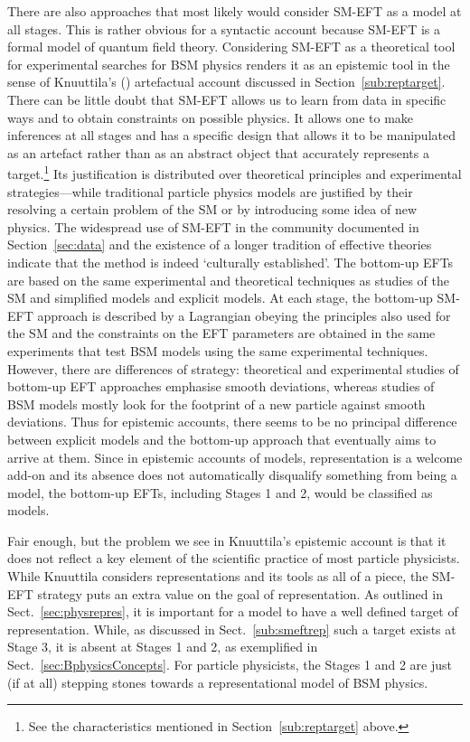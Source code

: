 There are also approaches that most likely would consider SM-EFT as a model at all stages. 
This is rather obvious for a syntactic account because SM-EFT is a formal model of quantum field theory. 
Considering SM-EFT as a theoretical tool for experimental searches for BSM physics renders it as an epistemic tool in the sense of Knuuttila's (\citeyear{knuuttila2011,Knuuttila2017}) artefactual account discussed in Section~\ref{sub:reptarget}.  
There can be little doubt that SM-EFT allows us to learn from data in specific ways and to obtain constraints on possible physics.
It allows one to make inferences at all stages and has a specific design that allows it to be manipulated as an artefact rather than as an abstract object that accurately represents a target.\footnote{See the characteristics mentioned in Section~\ref{sub:reptarget} above.} 
Its justification is distributed over theoretical principles and experimental strategies---while traditional particle physics models are justified by their resolving a certain problem of the SM or by introducing some idea of new physics.
The widespread use of SM-EFT in the community documented in Section~\ref{sec:data} and the existence of a longer tradition of effective theories \citep{wells2011} indicate that the method is indeed `culturally established'. 
The bottom-up EFTs are based on the same experimental and theoretical techniques as studies of the SM and simplified models and explicit models. 
At each stage, the bottom-up SM-EFT approach is described by a Lagrangian 
obeying the principles also used for the SM and the constraints on the EFT parameters are obtained in the same experiments that test BSM models using the same experimental techniques. 
However, there are differences of strategy: theoretical and experimental studies of bottom-up EFT approaches emphasise smooth deviations, whereas studies of BSM models mostly look for the footprint of a new particle against smooth deviations.
Thus for epistemic accounts, there seems to be no principal difference between explicit models and the bottom-up approach that eventually aims to arrive at them. 
Since in epistemic accounts of models, representation is a welcome add-on and its absence does not automatically disqualify something from being a model, the bottom-up EFTs, including Stages 1 and 2, would be classified as models.


Fair enough, but the problem we see in Knuuttila's epistemic account is that it does not reflect a key element of the scientific practice of most particle physicists. 
While Knuuttila considers representations and its tools as all of a piece, the SM-EFT strategy puts an extra value on the goal of representation. 
As outlined in Sect.~\ref{sec:physrepres}, it is important for a model to have a well defined target of representation. 
While, as discussed in Sect.~\ref{sub:smeftrep} such a target exists at Stage 3, it is absent at Stages 1 and 2, as exemplified in Sect.~\ref{sec:BphysicsConcepts}. 
For particle physicists, the Stages 1 and 2 are just (if at all) stepping stones towards a representational model of BSM physics.



